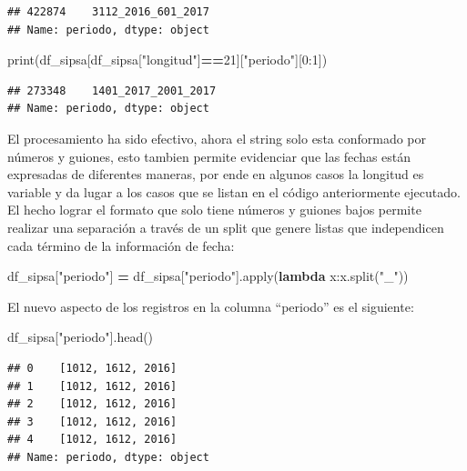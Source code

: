 \documentclass[
]{book}
\newenvironment{Shaded}{\begin{snugshade}}{\end{snugshade}}
\newcommand{\BuiltInTok}[1]{#1}
\newcommand{\DecValTok}[1]{\textcolor[rgb]{0.00,0.00,0.81}{#1}}
\newcommand{\KeywordTok}[1]{\textcolor[rgb]{0.13,0.29,0.53}{\textbf{#1}}}
\newcommand{\NormalTok}[1]{#1}
\newcommand{\OperatorTok}[1]{\textcolor[rgb]{0.81,0.36,0.00}{\textbf{#1}}}
\newcommand{\StringTok}[1]{\textcolor[rgb]{0.31,0.60,0.02}{#1}}
\begin{document}
\begin{verbatim}
## 422874    3112_2016_601_2017
## Name: periodo, dtype: object
\end{verbatim}

\begin{Shaded}
\begin{Highlighting}[]
\BuiltInTok{print}\NormalTok{(df\_sipsa[df\_sipsa[}\StringTok{"longitud"}\NormalTok{]}\OperatorTok{==}\DecValTok{21}\NormalTok{][}\StringTok{"periodo"}\NormalTok{][}\DecValTok{0}\NormalTok{:}\DecValTok{1}\NormalTok{])}
\end{Highlighting}
\end{Shaded}

\begin{verbatim}
## 273348    1401_2017_2001_2017
## Name: periodo, dtype: object
\end{verbatim}

El procesamiento ha sido efectivo, ahora el string solo esta conformado por números y guiones, esto tambien permite evidenciar que las fechas están expresadas de diferentes maneras, por ende en algunos casos la longitud es variable y da lugar a los casos que se listan en el código anteriormente ejecutado.\\
El hecho lograr el formato que solo tiene números y guiones bajos permite realizar una separación a través de un split que genere listas que independicen cada término de la información de fecha:

\begin{Shaded}
\begin{Highlighting}[]

\NormalTok{df\_sipsa[}\StringTok{"periodo"}\NormalTok{] }\OperatorTok{=}\NormalTok{ df\_sipsa[}\StringTok{"periodo"}\NormalTok{].}\BuiltInTok{apply}\NormalTok{(}\KeywordTok{lambda}\NormalTok{ x:x.split(}\StringTok{"\_"}\NormalTok{))}
\end{Highlighting}
\end{Shaded}

El nuevo aspecto de los registros en la columna ``periodo'' es el siguiente:

\begin{Shaded}
\begin{Highlighting}[]

\NormalTok{df\_sipsa[}\StringTok{"periodo"}\NormalTok{].head()}
\end{Highlighting}
\end{Shaded}

\begin{verbatim}
## 0    [1012, 1612, 2016]
## 1    [1012, 1612, 2016]
## 2    [1012, 1612, 2016]
## 3    [1012, 1612, 2016]
## 4    [1012, 1612, 2016]
## Name: periodo, dtype: object
\end{verbatim}
\end{document}

